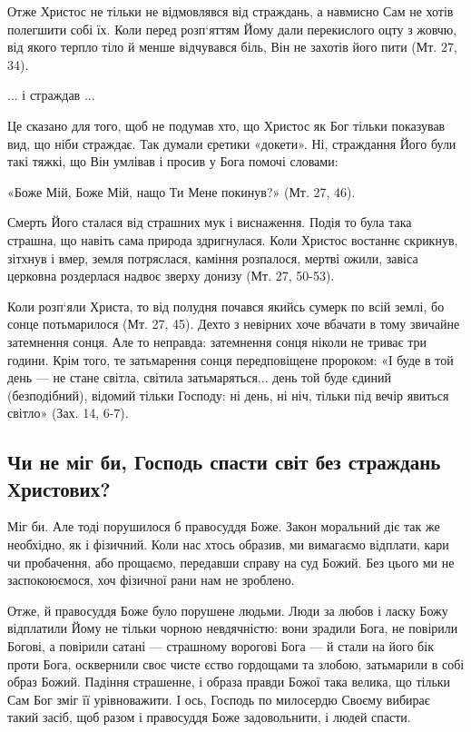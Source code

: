 \documentclass[main.tex]{subfiles}
\begin{document}
Отже Христос не тільки не відмовлявся від страждань, а навмисно Сам не хотів полегшити собі їх. Коли перед розп`яттям Йому дали перекислого оцту з жовчю, від якого терпло тіло й менше відчувався біль, Він не захотів його пити (Мт. 27, 34).

... і страждав ...

Це сказано для того, щоб не подумав хто, що Христос як Бог тільки показував вид, що ніби страждає. Так думали єретики «докети». Ні, страждання Його були такі тяжкі, що Він умлівав і просив у Бога помочі словами:

«Боже Мій, Боже Мій, нащо Ти Мене покинув?» (Мт. 27, 46).

Смерть Його сталася від страшних мук і виснаження. Подія то була така страшна, що навіть сама природа здригнулася. Коли Христос востаннє скрикнув, зітхнув і вмер, земля потряслася, каміння розпалося, мертві ожили, завіса церковна роздерлася надвоє зверху донизу (Мт. 27, 50-53).

Коли розп`яли Христа, то від полудня почався якийсь сумерк по всій землі, бо сонце потьмарилося (Мт. 27, 45). Дехто з невірних хоче вбачати в тому звичайне затемнення сонця. Але то неправда: затемнення сонця ніколи не триває три години. Крім того, те затьмарення сонця передповіщене пророком: «І буде в той день — не стане світла, світила затьмаряться... день той буде єдиний (безподібний), відомий тільки Господу: ні день, ні ніч, тільки під вечір явиться світло» (Зах. 14, 6-7).

\subsection{Чи не міг би, Господь спасти світ без страждань Христових?}

Міг би. Але тоді порушилося б правосуддя Боже. Закон моральний діє так же необхідно, як і фізичний. Коли нас хтось образив, ми вимагаємо відплати, кари чи пробачення, або прощаємо, передавши справу на суд Божий. Без цього ми не заспокоюємося, хоч фізичної рани нам не зроблено.
 
Отже, й правосуддя Боже було порушене людьми. Люди за любов і ласку Божу відплатили Йому не тільки чорною невдячністю: вони зрадили Бога, не повірили Богові, а повірили сатані — страшному ворогові Бога — й стали на його бік проти Бога, осквернили своє чисте єство гордощами та злобою, затьмарили в собі образ Божий. Падіння страшенне, і образа правди Божої така велика, що тільки Сам Бог зміг її урівноважити. І ось, Господь по милосердю Своєму вибирає такий засіб, щоб разом і правосуддя Боже задовольнити, і людей спасти.
\end{document}
